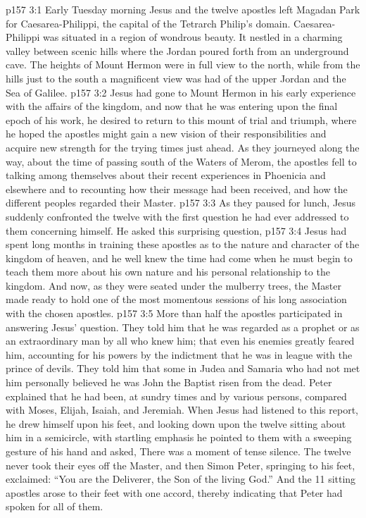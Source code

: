 \vs p157 3:1 Early Tuesday morning Jesus and the twelve apostles left Magadan Park for Caesarea\hyp{}Philippi, the capital of the Tetrarch Philip’s domain. Caesarea\hyp{}Philippi was situated in a region of wondrous beauty. It nestled in a charming valley between scenic hills where the Jordan poured forth from an underground cave. The heights of Mount Hermon were in full view to the north, while from the hills just to the south a magnificent view was had of the upper Jordan and the Sea of Galilee.
\vs p157 3:2 Jesus had gone to Mount Hermon in his early experience with the affairs of the kingdom, and now that he was entering upon the final epoch of his work, he desired to return to this mount of trial and triumph, where he hoped the apostles might gain a new vision of their responsibilities and acquire new strength for the trying times just ahead. As they journeyed along the way, about the time of passing south of the Waters of Merom, the apostles fell to talking among themselves about their recent experiences in Phoenicia and elsewhere and to recounting how their message had been received, and how the different peoples regarded their Master.
\vs p157 3:3 As they paused for lunch, Jesus suddenly confronted the twelve with the first question he had ever addressed to them concerning himself. He asked this surprising question, 
\vs p157 3:4 \pc Jesus had spent long months in training these apostles as to the nature and character of the kingdom of heaven, and he well knew the time had come when he must begin to teach them more about his own nature and his personal relationship to the kingdom. And now, as they were seated under the mulberry trees, the Master made ready to hold one of the most momentous sessions of his long association with the chosen apostles.
\vs p157 3:5 \pc More than half the apostles participated in answering Jesus’ question. They told him that he was regarded as a prophet or as an extraordinary man by all who knew him; that even his enemies greatly feared him, accounting for his powers by the indictment that he was in league with the prince of devils. They told him that some in Judea and Samaria who had not met him personally believed he was John the Baptist risen from the dead. Peter explained that he had been, at sundry times and by various persons, compared with Moses, Elijah, Isaiah, and Jeremiah. When Jesus had listened to this report, he drew himself upon his feet, and looking down upon the twelve sitting about him in a semicircle, with startling emphasis he pointed to them with a sweeping gesture of his hand and asked,  There was a moment of tense silence. The twelve never took their eyes off the Master, and then Simon Peter, springing to his feet, exclaimed: “You are the Deliverer, the Son of the living God.” And the 11 sitting apostles arose to their feet with one accord, thereby indicating that Peter had spoken for all of them.
